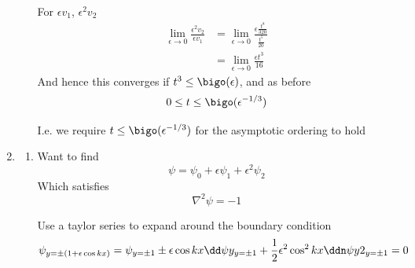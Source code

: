 \documentclass{/home/janmebows/Documents/LatexTemplates/myassignment}
\begin{document}
\begin{enumerate}
\begin{enumerate}
        For $\epsilon v_1$, $\epsilon^2 v_2$
        \begin{align*}
            \lim_{\epsilon\to 0} \frac{\epsilon^2 v_2}{\epsilon v_1} &= \lim_{\epsilon\to 0} \frac{\epsilon \frac{t^8}{320}}{\frac{t^5}{20}}\\
            &= \lim_{\epsilon\to 0} \frac{\epsilon t^3}{16}
        \end{align*}
        And hence this converges if $t^3 \leq \bigo(\epsilon)$, and as before
        \[0 \leq t \leq \bigo(\epsilon^{-1/3})\]


        I.e. we require $t \leq \bigo(\epsilon^{-1/3})$ for the asymptotic ordering to hold
    \end{enumerate}













    \item 
    \begin{enumerate}
        \item %
        Want to find 
        \[\psi = \psi_0 + \epsilon \psi_1 + \epsilon^2 \psi_2\]
        Which satisfies
        \[\nabla^2 \psi = -1\]

        Use a taylor series to expand around the boundary condition
        \begin{align*}
            \psi_{y=\pm(1+\epsilon\cos kx)} = \psi_{y=\pm1} \pm \epsilon\cos kx\dd\psi y_{y=\pm1} + \frac12\epsilon^2\cos^2kx \ddn\psi y2_{y=\pm1} =0
        \end{align*}




        

\end{enumerate}
\end{enumerate}
\end{document}
